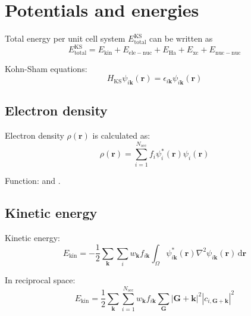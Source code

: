 \section{Potentials and energies}

Total energy per unit cell system
$E^{\mathrm{KS}}_{\mathrm{total}}$ can be written as
\begin{equation}
E^{\mathrm{KS}}_{\mathrm{total}} =
E_{\mathrm{kin}} + E_{\mathrm{ele-nuc}} +
E_{\mathrm{Ha}} + E_{\mathrm{xc}} + E_{\mathrm{nuc-nuc}}
\label{eq:E_KS_total}
\end{equation}

Kohn-Sham equations:
\begin{equation}
H_{\mathrm{KS}} \psi_{i\mathbf{k}}(\mathbf{r}) =
\epsilon_{i\mathbf{k}} \psi_{i\mathbf{k}}(\mathbf{r})
\end{equation}





\subsection{Electron density}

Electron density $\rho(\mathbf{r})$ is calculated as:
\begin{equation}
\rho(\mathbf{r}) = \sum_{i=1}^{N_{\mathrm{occ}}} f_{i} \psi^{*}_{i}(\mathbf{r})
\psi_{i}(\mathbf{r})
\end{equation}

Function:  and .

\subsection{Kinetic energy}

Kinetic energy:
\begin{equation}
E_{\mathrm{kin}} = -\frac{1}{2} \sum_{\mathbf{k}} \sum_{i}
w_{\mathbf{k}} f_{i\mathbf{k}}
\int_{\Omega}
\psi^{*}_{i\mathbf{k}}(\mathbf{r})
\nabla^2
\psi_{i\mathbf{k}}(\mathbf{r})
\,
\mathrm{d}\mathbf{r}
\label{eq:Kin_energy}
\end{equation}

In reciprocal space:
\begin{equation}
E_{\mathrm{kin}} =
\frac{1}{2} \sum_{\mathbf{k}} \sum_{i=1}^{N_{\mathrm{occ}}}
w_{\mathbf{k}} f_{i\mathbf{k}}
\sum_{\mathbf{G}} \left| \mathbf{G} + \mathbf{k} \right|^2
\left|c_{i,\mathbf{G}+\mathbf{k}}\right|^2
\end{equation}


